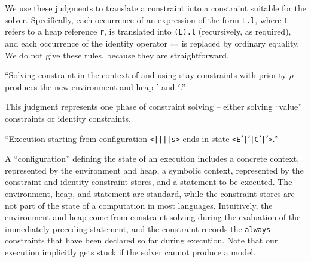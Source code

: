{}


We use these judgments to translate a constraint into a
constraint suitable for the solver. Specifically, each occurrence of
an expression of the form
\texttt{L.l}, where \texttt{L}
refers to a heap reference \texttt{r}, is translated  into \texttt{\Deref(L).l}
(recursively, as required), and each occurrence of the identity
operator {\tt ==} is replaced by ordinary equality.  We do not give these rules, because they are
straightforward. %


``Solving constraint \texttt{\C} in the context of \texttt{\Euid} and
\texttt{\Huid} using stay constraints with priority $\rho$ produces the new environment and heap \texttt{\Euid$'$} and
\texttt{\Huid$'$}.''


This judgment represents one phase of constraint solving -- either
solving ``value'' constraints or identity constraints.




``Execution starting from configuration \texttt{<\Euid|\Huid|\C|\I|s>} ends in
state \texttt{<E$'$|\Huid$'$|C$'$|\I$'$>}.''

A ``configuration'' defining the state of an execution includes a
concrete context, represented by the environment and heap, a symbolic
context, represented by the constraint and identity constraint stores,
and a statement to be executed. The environment, heap, and statement
are standard, while the constraint stores are not part of the state of
a computation in most languages.  Intuitively, the environment and
heap come
from constraint solving during the evaluation of the immediately
preceding statement, and the constraint records the \verb|always|
constraints that have been declared so far during execution. Note that
our execution implicitly gets stuck if the solver cannot produce a
model. 

